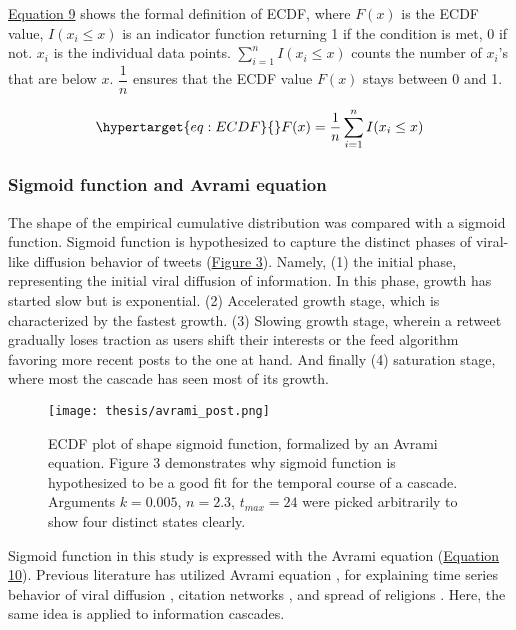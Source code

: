 \documentclass[11pt,a4paper]{article}
\begin{document}
        \hyperlink{eq:ECDF}{Equation 9} shows the formal definition of ECDF, where $F(x)$ is the ECDF value, $I(x_i \leq x)$ is an indicator function returning 1 if the condition is met, 0 if not. $x_i$ is the individual data points. $\sum_{i=1}^{n} I(x_i \leq x)$ counts the number of $x_i$'s that are below $x$.  $\dfrac{1}{n}$ ensures that the ECDF value $F(x)$ stays between 0 and 1.

        \begin{equation}
            \hypertarget{eq:ECDF}{}
            F(x) = \frac{1}{n} \sum_{i=1}^{n} I(x_i \leq x)
        \end{equation}

        \subsubsection{Sigmoid function and Avrami equation}
        \hypertarget{sec:sigmoid}{}
        The shape of the empirical cumulative distribution was compared with a sigmoid function. Sigmoid function is hypothesized to capture the distinct phases of viral-like diffusion behavior of tweets (\hyperlink{fig:sigmoid}{Figure 3}). Namely, (1) the initial phase, representing the initial viral diffusion of information. In this phase, growth has started slow but is exponential. (2) Accelerated growth stage, which is characterized by the fastest growth. (3) Slowing growth stage, wherein a retweet gradually loses traction as users shift their interests or the feed algorithm favoring more recent posts to the one at hand. And finally (4) saturation stage, where most the cascade has seen most of its growth.
        
        \begin{figure}[H]
            \hypertarget{fig:sigmoid}{}
            \centering
            \texttt{[image: thesis/avrami\_post.png]}\\
            \caption{ECDF plot of shape sigmoid function, formalized by an Avrami equation. Figure 3 demonstrates why sigmoid function is hypothesized to be a good fit for the temporal course of a cascade. Arguments $k = 0.005$, $n = 2.3$, $t_{max} = 24$ were picked arbitrarily to show four distinct states clearly.}
            \label{fig:enter-label}
        \end{figure}
        
        Sigmoid function in this study is expressed with the Avrami equation (\hyperlink{eq:avrami}{Equation 10}). Previous literature  has utilized Avrami equation \cite{shirzad_critical_2023}, for explaining time series behavior of viral diffusion \cite{avramov_kinetics_2007}, citation networks \cite{sangwal_comparison_2021}, and spread of religions \cite{ausloos_statistical_2007}. Here, the same idea is applied to information cascades.
\end{document}
